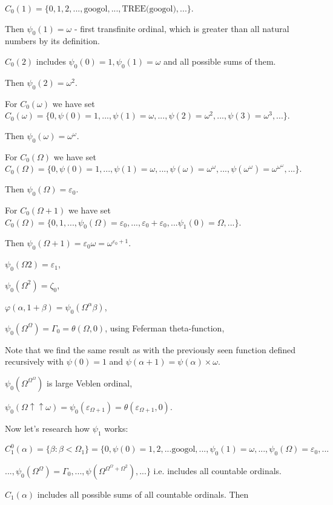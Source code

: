 \documentclass[10pt]{article}
\begin{document}
\(C_0(1)=\{0,1,2,...,\text{googol}, ...,\text{TREE(googol)},...\}\).

Then \(\psi_0(1)=\omega\) - first transfinite ordinal, which is greater than all natural numbers by its definition.

\(C_0(2)\) includes \(\psi_0(0)=1, \psi_0(1)=\omega\) and all possible sums of them.

Then \(\psi_0(2)=\omega^2\).

For \(C_0(\omega)\) we have set \(C_0(\omega)=\{0,\psi(0)=1,...,\psi(1)=\omega,...,\psi(2)=\omega^2,...,\psi(3)=\omega^3,...\}\).

Then \(\psi_0(\omega)=\omega^\omega\).

For \(C_0(\Omega)\) we have set \(C_0(\Omega)=\{0,\psi(0)=1,...,\psi(1)=\omega,...,\psi(\omega)=\omega^\omega,...,\psi(\omega^\omega)=\omega^{\omega^\omega},...\}\).

Then \(\psi_0(\Omega)=\varepsilon_0\).

For \(C_0(\Omega+1)\) we have set \(C_0(\Omega)=\{0,1,...,\psi_0(\Omega)=\varepsilon_0,...,\varepsilon_0+\varepsilon_0,...\psi_1(0)=\Omega,...\}\).

Then \(\psi_0(\Omega+1)=\varepsilon_0\omega=\omega^{\varepsilon_0+1}\).

\(\psi_0(\Omega2)=\varepsilon_1\),

\(\psi_0(\Omega^2)=\zeta_0\),

\(\varphi(\alpha,1+\beta)=\psi_0(\Omega^\alpha\beta)\),

\(\psi_0(\Omega^\Omega)=\Gamma_0=\theta(\Omega,0)\), using Feferman theta-function,

Note that we find the same result as with the previously seen function defined recursively with \( \psi(0) = 1 \) and \( \psi(\alpha+1) = \psi(\alpha) \times \omega \).

\(\psi_0(\Omega^{\Omega^\Omega})\) is large Veblen ordinal,

\(\psi_0(\Omega\uparrow\uparrow\omega)=\psi_0(\varepsilon_{\Omega+1})=\theta(\varepsilon_{\Omega+1},0)\).

Now let's research how \(\psi_1\) works:

\(C_1^0(\alpha)=\{\beta:\beta<\Omega_1\}=\{0,\psi(0)=1,2,...\text{googol},...,\psi_0(1)=\omega,...,\psi_0(\Omega)=\varepsilon_0,...\)

\(...,\psi_0(\Omega^\Omega)=\Gamma_0,...,\psi(\Omega^{\Omega^\Omega+\Omega^2}),...\}\) i.e. includes all countable ordinals.

\(C_1(\alpha)\) includes all possible sums of all countable ordinals. Then
\end{document}
